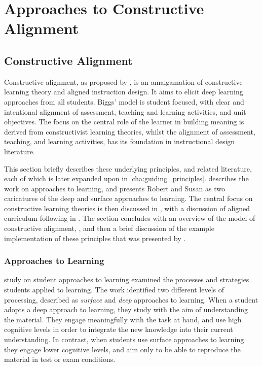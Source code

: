 
\chapter{Approaches to Constructive Alignment} %
\label{cha:background}

\graphicspath{{Figures/Background/}}




\section{Constructive Alignment} %
\label{sec:constructive_alignment}

Constructive alignment, as proposed by \citet{Biggs:1996c}, is an amalgamation of constructive learning theory and aligned instruction design. It aims to elicit deep learning approaches from all students. Biggs' model is student focused, with clear and intentional alignment of assessment, teaching and learning activities, and unit objectives. The focus on the central role of the learner in building meaning is derived from constructivist learning theories, whilst the alignment of assessment, teaching, and learning activities, has its foundation in instructional design literature. 

This section briefly describes these underlying principles, and related literature, each of which is later expanded upon in \cref{cha:guiding_principles}.  describes the work on approaches to learning, and presents Robert and Susan as two caricatures of the deep and surface approaches to learning. The central focus on constructive learning theories is then discussed in , with a discussion of aligned curriculum following in . The section concludes with an overview of the model of constructive alignment, , and then a brief discussion of the example implementation of these principles that was presented by \citet{Biggs:1996c}.

\subsection{Approaches to Learning} %
\label{sub:approaches_to_learning}

\citet{Marton:1976a} study on student approaches to learning examined the processes and strategies students applied to learning. The work identified two different levels of processing, described as \emph{surface} and \emph{deep} approaches to learning. When a student adopts a deep approach to learning, they study with the aim of understanding the material. They engage meaningfully with the task at hand, and use high cognitive levels in order to integrate the new knowledge into their current understanding. In contrast, when students use surface approaches to learning they engage lower cognitive levels, and aim only to be able to reproduce the material in test or exam conditions.

